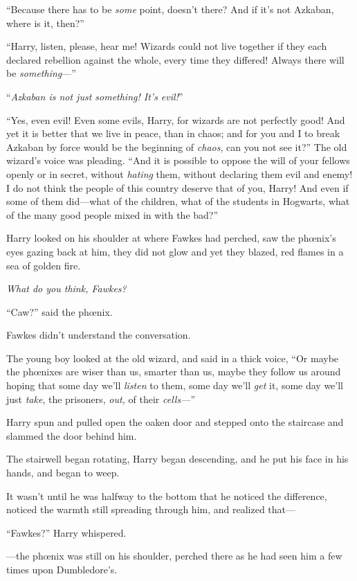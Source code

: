“Because there has to be \emph{some} point, doesn’t there? And if it’s not Azkaban, where is it, then?”

“Harry, listen, please, hear me! Wizards could not live together if they each declared rebellion against the whole, every time they differed! Always there will be \emph{something}—”

“\emph{Azkaban is not just something! It’s evil!}”

“Yes, even evil! Even some evils, Harry, for wizards are not perfectly good! And yet it is better that we live in peace, than in chaos; and for you and I to break Azkaban by force would be the beginning of \emph{chaos}, can you not see it?” The old wizard’s voice was pleading. “And it is possible to oppose the will of your fellows openly or in secret, without \emph{hating} them, without declaring them evil and enemy! I do not think the people of this country deserve that of you, Harry! And even if some of them did—what of the children, what of the students in Hogwarts, what of the many good people mixed in with the bad?”

Harry looked on his shoulder at where Fawkes had perched, saw the phœnix’s eyes gazing back at him, they did not glow and yet they blazed, red flames in a sea of golden fire.

\emph{What do you think, Fawkes?}

“Caw?” said the phœnix.

Fawkes didn’t understand the conversation.

The young boy looked at the old wizard, and said in a thick voice, “Or maybe the phœnixes are wiser than us, smarter than us, maybe they follow us around hoping that some day we’ll \emph{listen} to them, some day we’ll \emph{get} it, some day we’ll just \emph{take}, the prisoners, \emph{out,} of their \emph{cells—}”

Harry spun and pulled open the oaken door and stepped onto the staircase and slammed the door behind him.

The stairwell began rotating, Harry began descending, and he put his face in his hands, and began to weep.

It wasn’t until he was halfway to the bottom that he noticed the difference, noticed the warmth still spreading through him, and realized that—

“Fawkes?” Harry whispered.

—the phœnix was still on his shoulder, perched there as he had seen him a few times upon Dumbledore’s.

